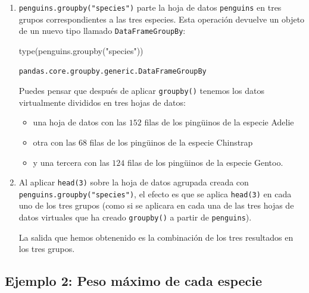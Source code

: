 \documentclass[
  a4paper,
  noprof,
  12pt,
  notoc,
  nosols,
  nobib]{mnye}
\newenvironment{Shaded}{\begin{snugshade}}{\end{snugshade}}
\newcommand{\BuiltInTok}[1]{\textcolor[rgb]{0.00,0.23,0.31}{#1}}
\newcommand{\NormalTok}[1]{\textcolor[rgb]{0.00,0.23,0.31}{#1}}
\newcommand{\StringTok}[1]{\textcolor[rgb]{0.13,0.47,0.30}{#1}}
\providecommand{\tightlist}{%
  \setlength{\itemsep}{0pt}\setlength{\parskip}{0pt}}\usepackage{longtable,booktabs,array}
\theoremstyle{definition}
\theoremstyle{remark}
\begin{document}
\begin{enumerate}
\def\labelenumi{\arabic{enumi}.}
\item
  \texttt{penguins.groupby("species")} parte la hoja de datos
  \texttt{penguins} en tres grupos correspondientes a las tres especies.
  Esta operación devuelve un objeto de un nuevo tipo llamado
  \texttt{DataFrameGroupBy}:

\begin{Shaded}
\begin{Highlighting}[]
\BuiltInTok{type}\NormalTok{(penguins.groupby(}\StringTok{"species"}\NormalTok{))}
\end{Highlighting}
\end{Shaded}

\begin{verbatim}
pandas.core.groupby.generic.DataFrameGroupBy
\end{verbatim}

  Puedes pensar que después de aplicar \texttt{groupby()} tenemos los
  datos virtualmente divididos en tres hojas de datos:

  \begin{itemize}
  \tightlist
  \item
    una hoja de datos con las \(152\) filas de los pingüinos de la
    especie Adelie
  \item
    otra con las \(68\) filas de los pingüinos de la especie Chinstrap
  \item
    y una tercera con las \(124\) filas de los pingüinos de la especie
    Gentoo.
  \end{itemize}
\item
  Al aplicar \texttt{head(3)} sobre la hoja de datos agrupada creada con
  \texttt{penguins.groupby("species")}, el efecto es que se aplica
  \texttt{head(3)} en cada uno de los tres grupos (como si se aplicara
  en cada una de las tres hojas de datos virtuales que ha creado
  \texttt{groupby()} a partir de \texttt{penguins}).

  La salida que hemos obtenenido es la combinación de los tres
  resultados en los tres grupos.
\end{enumerate}

\hypertarget{ejemplo-2-peso-muxe1ximo-de-cada-especie}{%
\subsection*{Ejemplo 2: Peso máximo de cada
especie}\label{ejemplo-2-peso-muxe1ximo-de-cada-especie}}
\end{document}
